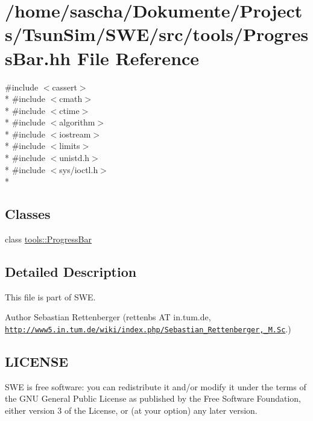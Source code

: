 \hypertarget{ProgressBar_8hh}{\section{/home/sascha/\-Dokumente/\-Projects/\-Tsun\-Sim/\-S\-W\-E/src/tools/\-Progress\-Bar.hh File Reference}
\label{ProgressBar_8hh}
}
{\ttfamily \#include $<$cassert$>$}\\*
{\ttfamily \#include $<$cmath$>$}\\*
{\ttfamily \#include $<$ctime$>$}\\*
{\ttfamily \#include $<$algorithm$>$}\\*
{\ttfamily \#include $<$iostream$>$}\\*
{\ttfamily \#include $<$limits$>$}\\*
{\ttfamily \#include $<$unistd.\-h$>$}\\*
{\ttfamily \#include $<$sys/ioctl.\-h$>$}\\*
\subsection*{Classes}
\begin{DoxyCompactItemize}
\item 
class \hyperlink{classtools_1_1ProgressBar}{tools\-::\-Progress\-Bar}
\end{DoxyCompactItemize}


\subsection{Detailed Description}
This file is part of S\-W\-E.

\begin{DoxyAuthor}{Author}
Sebastian Rettenberger (rettenbs A\-T in.\-tum.\-de, \href{http://www5.in.tum.de/wiki/index.php/Sebastian_Rettenberger,_M.Sc}{\tt http\-://www5.\-in.\-tum.\-de/wiki/index.\-php/\-Sebastian\-\_\-\-Rettenberger,\-\_\-\-M.\-Sc}.)
\end{DoxyAuthor}
\hypertarget{Writer_8hh_LICENSE}{}\subsection{L\-I\-C\-E\-N\-S\-E}\label{Writer_8hh_LICENSE}
S\-W\-E is free software\-: you can redistribute it and/or modify it under the terms of the G\-N\-U General Public License as published by the Free Software Foundation, either version 3 of the License, or (at your option) any later version.


